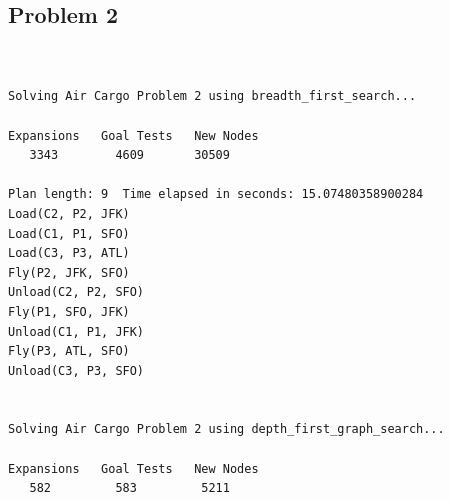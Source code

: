 \documentclass[10pt, a4paper,english]{article}
\begin{document}
\subsection{Problem 2}
\begin{lstlisting}


Solving Air Cargo Problem 2 using breadth_first_search...

Expansions   Goal Tests   New Nodes
   3343        4609       30509   

Plan length: 9  Time elapsed in seconds: 15.07480358900284
Load(C2, P2, JFK)
Load(C1, P1, SFO)
Load(C3, P3, ATL)
Fly(P2, JFK, SFO)
Unload(C2, P2, SFO)
Fly(P1, SFO, JFK)
Unload(C1, P1, JFK)
Fly(P3, ATL, SFO)
Unload(C3, P3, SFO)


Solving Air Cargo Problem 2 using depth_first_graph_search...

Expansions   Goal Tests   New Nodes
   582         583         5211   


\end{lstlisting}
\end{document}

